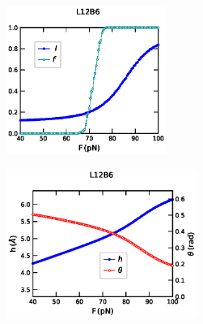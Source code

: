 \documentclass[12pt,masters,final]{UTRGVthesis}
\begin{document}
\begin{figure}[!h]
        \begin{subfigure}[b]{0.49\textwidth}
                \centering
                \includegraphics[height=1.9in, width=.8\textwidth]{L12B6_Pope_force_lf.eps}
                \caption{}
                \label{fig:L12B6lf}
        \end{subfigure}%
        \hspace{1pt}
        \hfill
        \begin{subfigure}[b]{0.49\textwidth}
                \centering
                \includegraphics[height=1.9in, width=.8\textwidth]{L12B6_Pope_force_h_theta.eps}
                \caption{}
                \label{fig:L12B6htheta}
        \end{subfigure}%
        

\end{figure}
\end{document}
